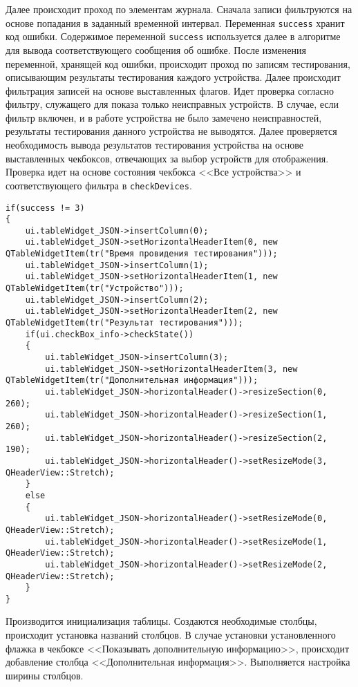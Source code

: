 Далее происходит проход по элементам журнала. Сначала записи фильтруются на основе попадания в заданный временной
интервал.
Переменная \texttt{success} хранит код ошибки. Содержимое переменной \texttt{success} используется далее в алгоритме для
вывода соответствующего сообщения об ошибке.
После изменения переменной, хранящей код ошибки, происходит проход по записям тестирования, описывающим результаты тестирования каждого устройства.
Далее происходит фильтрация записей на основе выставленных флагов. Идет проверка согласно фильтру, служащего для показа только
неисправных устройств. В случае, если фильтр включен, и в работе устройства не было замечено неисправностей, результаты
тестирования данного устройства не выводятся. Далее проверяется необходимость вывода результатов тестирования устройства
на основе выставленных чекбоксов, отвечающих за выбор устройств для отображения. Проверка идет на основе состояния
чекбокса <<Все устройства>> и соответствующего фильтра в \texttt{checkDevices}.
\medskip
\begin{verbatim}
if(success != 3)
{
	ui.tableWidget_JSON->insertColumn(0);
	ui.tableWidget_JSON->setHorizontalHeaderItem(0, new QTableWidgetItem(tr("Время провидения тестирования")));
	ui.tableWidget_JSON->insertColumn(1);
	ui.tableWidget_JSON->setHorizontalHeaderItem(1, new QTableWidgetItem(tr("Устройство")));
	ui.tableWidget_JSON->insertColumn(2);
	ui.tableWidget_JSON->setHorizontalHeaderItem(2, new QTableWidgetItem(tr("Результат тестирования")));
	if(ui.checkBox_info->checkState())
	{
		ui.tableWidget_JSON->insertColumn(3);
		ui.tableWidget_JSON->setHorizontalHeaderItem(3, new QTableWidgetItem(tr("Дополнительная информация")));
		ui.tableWidget_JSON->horizontalHeader()->resizeSection(0, 260);
		ui.tableWidget_JSON->horizontalHeader()->resizeSection(1, 260);
		ui.tableWidget_JSON->horizontalHeader()->resizeSection(2, 190);
		ui.tableWidget_JSON->horizontalHeader()->setResizeMode(3, QHeaderView::Stretch);
	}
	else
	{
		ui.tableWidget_JSON->horizontalHeader()->setResizeMode(0, QHeaderView::Stretch);
		ui.tableWidget_JSON->horizontalHeader()->setResizeMode(1, QHeaderView::Stretch);
		ui.tableWidget_JSON->horizontalHeader()->setResizeMode(2, QHeaderView::Stretch);
	}
}
\end{verbatim}
\medskip

Производится инициализация таблицы. Создаются необходимые столбцы, происходит установка названий столбцов. В случае
установки установленного флажка в чекбоксе <<Показывать дополнительную информацию>>, происходит добавление столбца
<<Дополнительная информация>>. Выполняется настройка ширины столбцов.

